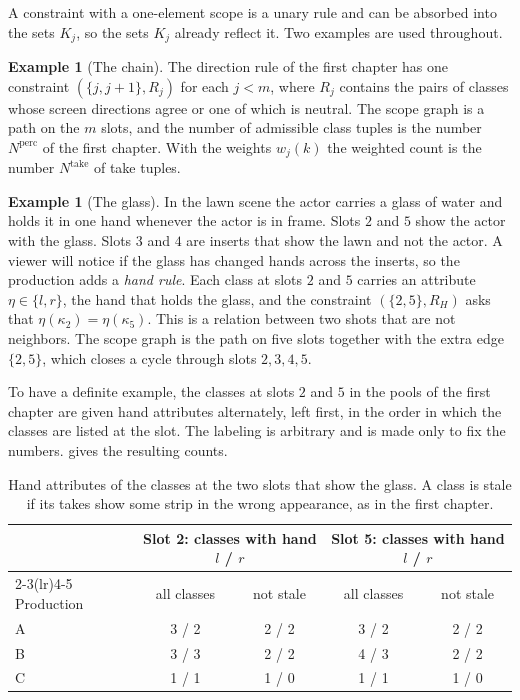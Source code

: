 \documentclass[11pt,twoside,openright]{book}
\theoremstyle{plain}
\theoremstyle{definition}
\newtheorem{example}[theorem]{Example}
\theoremstyle{remark}
\begin{document}
A constraint with a one-element scope is a unary rule and can be absorbed into the sets $K_j$, so the sets $K_j$ already reflect it. Two examples are used throughout.

\begin{example}[The chain]\label{ex:chain}
The direction rule of the first chapter has one constraint $(\{j,j+1\},R_j)$ for each $j<m$, where $R_j$ contains the pairs of classes whose screen directions agree or one of which is neutral. The scope graph is a path on the $m$ slots, and the number of admissible class tuples is the number $N^{\mathrm{perc}}$ of the first chapter. With the weights $w_j(k)$ the weighted count is the number $N^{\mathrm{take}}$ of take tuples.
\end{example}

\begin{example}[The glass]\label{ex:glass}
In the lawn scene the actor carries a glass of water and holds it in one hand whenever the actor is in frame. Slots $2$ and $5$ show the actor with the glass. Slots $3$ and $4$ are inserts that show the lawn and not the actor. A viewer will notice if the glass has changed hands across the inserts, so the production adds a \emph{hand rule}. Each class at slots $2$ and $5$ carries an attribute $\eta\in\{l,r\}$, the hand that holds the glass, and the constraint $(\{2,5\},R_H)$ asks that $\eta(\kappa_2)=\eta(\kappa_5)$. This is a relation between two shots that are not neighbors. The scope graph is the path on five slots together with the extra edge $\{2,5\}$, which closes a cycle through slots $2,3,4,5$.
\end{example}

To have a definite example, the classes at slots $2$ and $5$ in the pools of the first chapter are given hand attributes alternately, left first, in the order in which the classes are listed at the slot. The labeling is arbitrary and is made only to fix the numbers.  gives the resulting counts.

\begin{table}[ht]
\centering
\begin{tabular}{@{}lcccc@{}}
\toprule
 & \multicolumn{2}{c}{Slot 2: classes with hand $l$ / $r$} & \multicolumn{2}{c}{Slot 5: classes with hand $l$ / $r$}\\
\cmidrule(lr){2-3}\cmidrule(lr){4-5}
Production & all classes & not stale & all classes & not stale\\
\midrule
A & 3 / 2 & 2 / 2 & 3 / 2 & 2 / 2\\
B & 3 / 3 & 2 / 2 & 4 / 3 & 2 / 2\\
C & 1 / 1 & 1 / 0 & 1 / 1 & 1 / 0\\
\bottomrule
\end{tabular}
\caption{Hand attributes of the classes at the two slots that show the glass. A class is stale if its takes show some strip in the wrong appearance, as in the first chapter.}\label{tab:hands}
\end{table}
\end{document}
